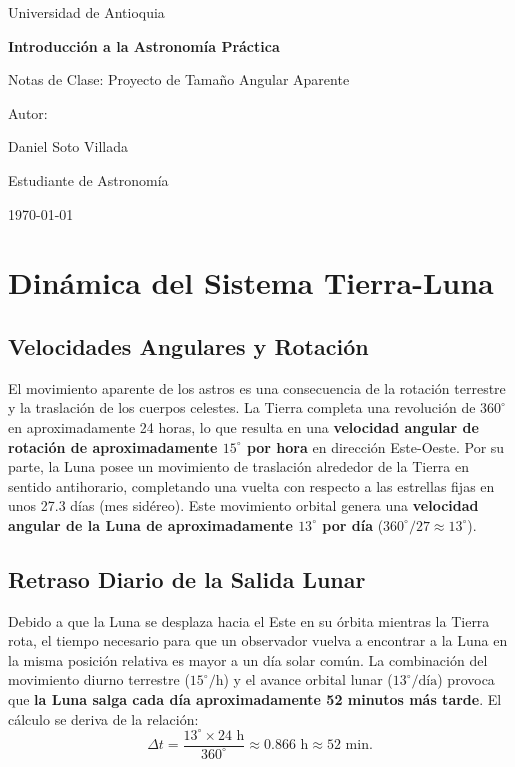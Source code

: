 \documentclass[a4paper]{article}
\begin{document}
\begin{titlepage}
  \centering
  {\Large Universidad de Antioquia\par}
  \vspace{2cm}
  {\huge\bfseries Introducción a la Astronomía Práctica\par}
  \vspace{0.4cm}
  {\Large Notas de Clase: Proyecto de Tamaño Angular Aparente\par}
  \vspace{2.5cm}
  {\large Autor:\par}
  \vspace{0.2cm}
  {\large Daniel Soto Villada\par}
  {\large Estudiante de Astronomía\par}
  \vfill
  {\large \today\par}
\end{titlepage}

\newpage
\tableofcontents
\newpage


\section{Dinámica del Sistema Tierra-Luna}

\subsection{Velocidades Angulares y Rotación}

El movimiento aparente de los astros es una consecuencia de la rotación terrestre y la traslación de los cuerpos celestes. La Tierra completa una revolución de $360^\circ$ en aproximadamente 24 horas, lo que resulta en una \textbf{velocidad angular de rotación de aproximadamente $15^\circ$ por hora} en dirección Este-Oeste. Por su parte, la Luna posee un movimiento de traslación alrededor de la Tierra en sentido antihorario, completando una vuelta con respecto a las estrellas fijas en unos 27.3 días (mes sidéreo). Este movimiento orbital genera una \textbf{velocidad angular de la Luna de aproximadamente $13^\circ$ por día} ($360^\circ / 27 \approx 13^\circ$).

\subsection{Retraso Diario de la Salida Lunar}

Debido a que la Luna se desplaza hacia el Este en su órbita mientras la Tierra rota, el tiempo necesario para que un observador vuelva a encontrar a la Luna en la misma posición relativa es mayor a un día solar común. La combinación del movimiento diurno terrestre ($15^\circ/\text{h}$) y el avance orbital lunar ($13^\circ/\text{día}$) provoca que \textbf{la Luna salga cada día aproximadamente 52 minutos más tarde}. El cálculo se deriva de la relación:
$$\Delta t = \frac{13^\circ \times 24 \text{ h}}{360^\circ} \approx 0.866 \text{ h} \approx 52 \text{ min}.$$
\end{document}
